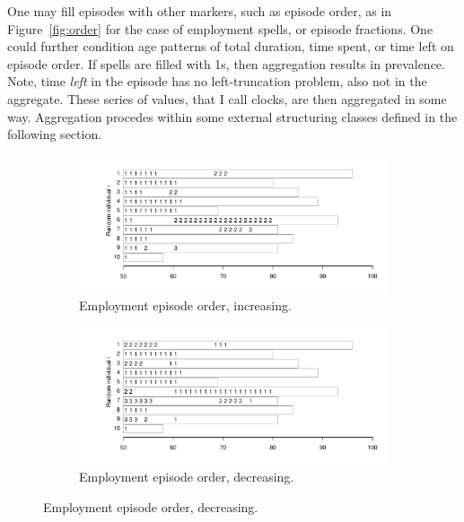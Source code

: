 \documentclass{article}
\begin{document}
One may fill episodes with other markers, such as episode
order, as in Figure~\ref{fig:order} for the case of employment spells, or
episode fractions. One could further condition age patterns of total duration, time spent, or time left on episode order. If spells are
filled with 1s, then aggregation results in prevalence. Note, time \emph{left}
in the episode has no left-truncation problem, also not in the aggregate. 
These series of values, that I call clocks, are then aggregated in some
way. Aggregation procedes within some external structuring classes defined in
the following section.

\begin{figure}[ht!]
\centering
\caption{Employment episodes from Figure~\ref{fig:seq10}
are imputed with order count variables.}
\label{fig:order}

\begin{subfigure}{\textwidth}
\caption{Employment episode order, increasing.}
\label{fig:orderup}
\includegraphics[scale=.5]{Figures/Seq10ordUp.pdf}
\end{subfigure}

\begin{subfigure}{\textwidth}
\caption{Employment episode order, decreasing.}
\label{fig:orderdown}
\includegraphics[scale=.5]{Figures/Seq10ordDown.pdf}
\end{subfigure}

\end{figure}
\end{document}
